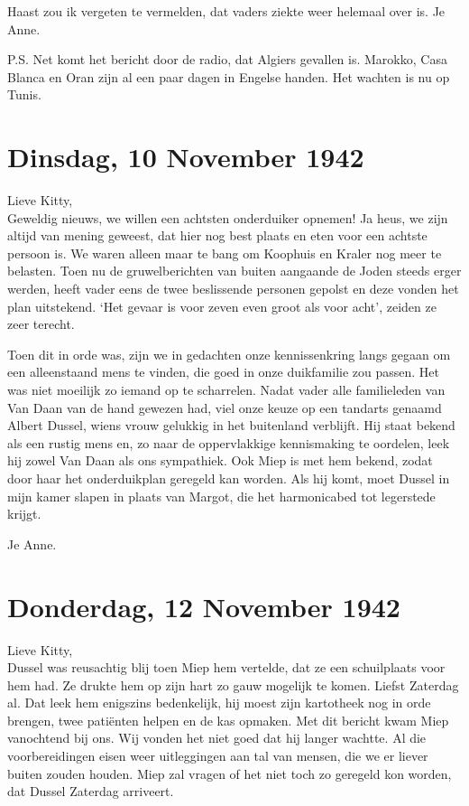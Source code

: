 \documentclass{book}
\begin{document}
Haast zou ik vergeten te vermelden, dat vaders ziekte weer helemaal over is. Je
Anne.

P.S. Net komt het bericht door de radio, dat Algiers gevallen is.  Marokko, Casa
Blanca en Oran zijn al een paar dagen in Engelse handen.  Het wachten is nu op
Tunis.

\section*{Dinsdag, 10 November 1942}

Lieve Kitty,\\
Geweldig nieuws, we willen een achtsten onderduiker opnemen! Ja
heus, we zijn altijd van mening geweest, dat hier nog best plaats en eten voor
een achtste persoon is. We waren alleen maar te bang om Koophuis en Kraler nog
meer te belasten. Toen nu de gruwelberichten van buiten aangaande de Joden
steeds erger werden, heeft vader eens de twee beslissende personen gepolst en
deze vonden het plan uitstekend. `Het gevaar is voor zeven even groot als voor
acht', zeiden ze zeer terecht.

Toen dit in orde was, zijn we in gedachten onze kennissenkring langs gegaan om
een alleenstaand mens te vinden, die goed in onze duikfamilie zou passen. Het
was niet moeilijk zo iemand op te scharrelen. Nadat vader alle familieleden van
Van Daan van de hand gewezen had, viel onze keuze op een tandarts genaamd Albert
Dussel, wiens vrouw gelukkig in het buitenland verblijft. Hij staat bekend als
een rustig mens en, zo naar de oppervlakkige kennismaking te oordelen, leek hij
zowel Van Daan als ons sympathiek. Ook Miep is met hem bekend, zodat door haar
het onderduikplan geregeld kan worden. Als hij komt, moet Dussel in mijn kamer
slapen in plaats van Margot, die het harmonicabed tot legerstede krijgt.

Je Anne.

\section*{Donderdag, 12 November 1942}

Lieve Kitty,\\
Dussel was reusachtig blij toen Miep hem vertelde, dat ze een
schuilplaats voor hem had. Ze drukte hem op zijn hart zo gauw mogelijk te komen.
Liefst Zaterdag al. Dat leek hem enigszins bedenkelijk, hij moest zijn
kartotheek nog in orde brengen, twee patiënten helpen en de kas opmaken.  Met
dit bericht kwam Miep vanochtend bij ons. Wij vonden het niet goed dat hij
langer wachtte. Al die voorbereidingen eisen weer uitleggingen aan tal van
mensen, die we er liever buiten zouden houden. Miep zal vragen of het niet toch
zo geregeld kon worden, dat Dussel Zaterdag arriveert.
\end{document}
